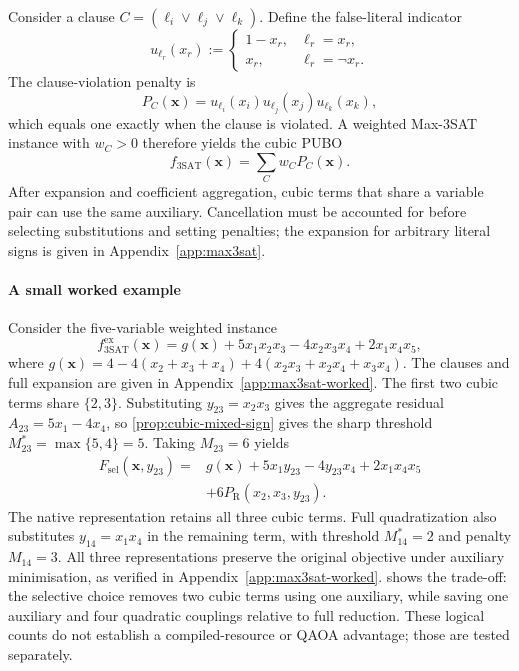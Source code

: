 \documentclass[a4paper,onecolumn,11pt,unpublished]{quantumarticle}
\newcommand{\PR}{P_{\mathrm R}}
\theoremstyle{remark}
\begin{document}
Consider a clause $C=(\ell_i\lor\ell_j\lor\ell_k)$. Define the false-literal indicator
\begin{equation}
    u_{\ell_r}(x_r)
    :=\begin{cases}
       1-x_r, & \ell_r=x_r,\\
       x_r, & \ell_r=\neg x_r.
    \end{cases}
    \label{eq:false-indicator}
\end{equation}
The clause-violation penalty is
\begin{equation}
    P_C(\bm x)=u_{\ell_i}(x_i)u_{\ell_j}(x_j)u_{\ell_k}(x_k),
    \label{eq:clause-penalty}
\end{equation}
which equals one exactly when the clause is violated. A weighted Max-3SAT
instance with $w_C>0$ therefore yields the cubic PUBO~\cite{Nagies2025,Nusslein2023}
\begin{equation}
    f_{\mathrm{3SAT}}(\bm x)=\sum_{C}w_CP_C(\bm x).
    \label{eq:max3sat-pubo}
\end{equation}
After expansion and coefficient aggregation, cubic terms that share a variable
pair can use the same auxiliary. Cancellation must be accounted for before
selecting substitutions and setting penalties; the expansion for arbitrary
literal signs is given in Appendix~\ref{app:max3sat}.

\paragraph{A small worked example}
\label{sec:max3sat-worked-example}

Consider the five-variable weighted instance
\begin{equation}
 f_{\mathrm{3SAT}}^{\mathrm{ex}}(\bm x)
 =g(\bm x)+5x_1x_2x_3-4x_2x_3x_4+2x_1x_4x_5,
 \label{eq:max3sat-worked-expanded}
\end{equation}
where $g(\bm x)=4-4(x_2+x_3+x_4)+4(x_2x_3+x_2x_4+x_3x_4)$.
The clauses and full expansion are given in
Appendix~\ref{app:max3sat-worked}.
The first two cubic terms share $\{2,3\}$. Substituting $y_{23}=x_2x_3$
gives the aggregate residual $A_{23}=5x_1-4x_4$, so
\cref{prop:cubic-mixed-sign} gives the sharp threshold
$M_{23}^{*}=\max\{5,4\}=5$. Taking $M_{23}=6$ yields
\begin{align}
 F_{\mathrm{sel}}(\bm x,y_{23})
 ={}&g(\bm x)+5x_1y_{23}-4y_{23}x_4+2x_1x_4x_5 \nonumber\\
 &+6\PR(x_2,x_3,y_{23}).
 \label{eq:max3sat-worked-selective}
\end{align}
The native representation retains all three cubic terms. Full quadratization
also substitutes $y_{14}=x_1x_4$ in the remaining term, with threshold
$M_{14}^{*}=2$ and penalty $M_{14}=3$. All three representations preserve
the original objective under auxiliary minimisation, as verified in
Appendix~\ref{app:max3sat-worked}.
 shows the trade-off: the selective choice
removes two cubic terms using one auxiliary, while saving one auxiliary and
four quadratic couplings relative to full reduction. These logical counts do
not establish a compiled-resource or QAOA advantage; those are tested separately.
\end{document}
